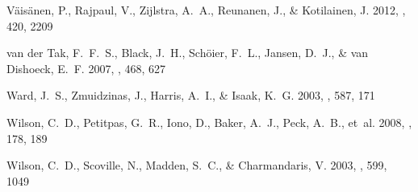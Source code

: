 \documentclass[preprint, 11pt]{aastex}
\begin{document}
\begin{thebibliography}{28}
{V{\"a}is{\"a}nen}, P., {Rajpaul}, V., {Zijlstra}, A.~A., {Reunanen}, J., \&
  {Kotilainen}, J. 2012, \mnras, 420, 2209

{van der Tak}, F.~F.~S., {Black}, J.~H., {Sch{\"o}ier}, F.~L., {Jansen}, D.~J.,
  \& {van Dishoeck}, E.~F. 2007, \aap, 468, 627

{Ward}, J.~S., {Zmuidzinas}, J., {Harris}, A.~I., \& {Isaak}, K.~G. 2003, \apj,
  587, 171

{Wilson}, C.~D., {Petitpas}, G.~R., {Iono}, D., {Baker}, A.~J., {Peck}, A.~B.,
  {et~al.} 2008, \apjs, 178, 189

{Wilson}, C.~D., {Scoville}, N., {Madden}, S.~C., \& {Charmandaris}, V. 2003,
  \apj, 599, 1049

\end{thebibliography}


\end{document}
